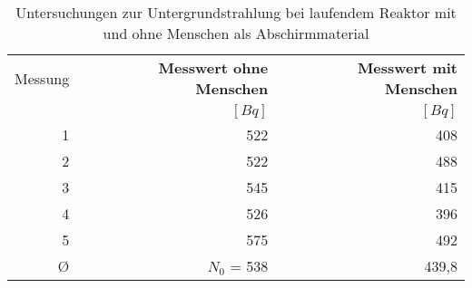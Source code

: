 \documentclass{article}
\begin{document}
\begin{table}[h!]
  	\begin{center}
    	\begin{tabular}{r|r|r}
      	Messung & \textbf{Messwert ohne Menschen} & \textbf{Messwert mit Menschen} \\
      	& $[Bq]$ & $[Bq]$  \\
      	\hline
      	1 & 522 & 408    \\
      	2 & 522 & 488    \\
      	3 & 545 & 415    \\
      	4 & 526 & 396    \\
      	5 & 575 & 492    \\
      	\hline      
      	\O & $N_0$ = 538 & 439,8 \\
    	\end{tabular}
    	\caption{Untersuchungen zur Untergrundstrahlung bei laufendem Reaktor mit und ohne Menschen als Abschirmmaterial}
    	\label{tab:table1}
   
  \end{center}
\end{table}
\end{document}

